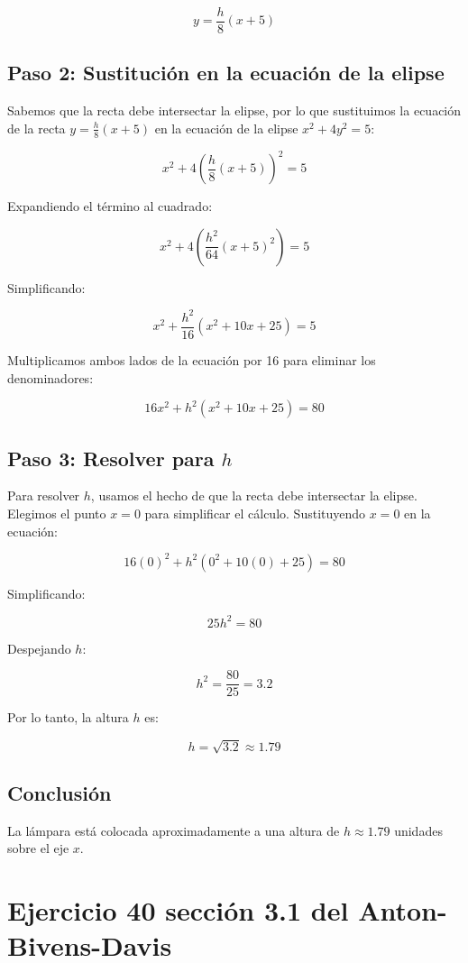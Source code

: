 \documentclass[11pt,letterpaper]{article}
\begin{document}
\[
y = \frac{h}{8}(x + 5)
\]

\subsection*{Paso 2: Sustitución en la ecuación de la elipse}

Sabemos que la recta debe intersectar la elipse, por lo que sustituimos la ecuación de la recta \( y = \frac{h}{8}(x + 5) \) en la ecuación de la elipse \( x^2 + 4y^2 = 5 \):

\[
x^2 + 4\left( \frac{h}{8}(x + 5) \right)^2 = 5
\]

Expandiendo el término al cuadrado:

\[
x^2 + 4\left( \frac{h^2}{64}(x + 5)^2 \right) = 5
\]

Simplificando:

\[
x^2 + \frac{h^2}{16}(x^2 + 10x + 25) = 5
\]

Multiplicamos ambos lados de la ecuación por 16 para eliminar los denominadores:

\[
16x^2 + h^2(x^2 + 10x + 25) = 80
\]

\subsection*{Paso 3: Resolver para \(h\)}

Para resolver \(h\), usamos el hecho de que la recta debe intersectar la elipse. Elegimos el punto \(x = 0\) para simplificar el cálculo. Sustituyendo \(x = 0\) en la ecuación:

\[
16(0)^2 + h^2(0^2 + 10(0) + 25) = 80
\]

Simplificando:

\[
25h^2 = 80
\]

Despejando \(h\):

\[
h^2 = \frac{80}{25} = 3.2
\]

Por lo tanto, la altura \(h\) es:

\[
h = \sqrt{3.2} \approx 1.79
\]

\subsection*{Conclusión}

La lámpara está colocada aproximadamente a una altura de \(h \approx 1.79\) unidades sobre el eje \(x\).

\section*{Ejercicio 40 sección 3.1 del Anton-Bivens-Davis}
\end{document}
